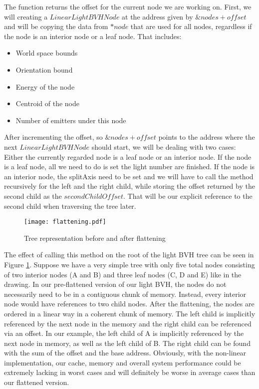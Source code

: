 The function returns the offset for the current node we are working on. First, we will creating a $LinearLightBVHNode$ at the address given by $\&nodes + offset$ and will be copying the data from $*node$ that are used for all nodes, regardless if the node is an interior node or a leaf node. That includes:

\begin{itemize}
	\item World space bounds
	\item Orientation bound
	\item Energy of the node
	\item Centroid of the node
	\item Number of emitters under this node
\end{itemize} 

After incrementing the offset, so $\&nodes + offset$ points to the address where the next $LinearLightBVHNode$ should start, we will be dealing with two cases: Either the currently regarded node is a leaf node or an interior node. If the node is a leaf node, all we need to do is set the light number are finished. If the node is an interior node, the splitAxis need to be set and we will have to call the method recursively for the left and the right child, while storing the offset returned by the second child as the $secondChildOffset$. That will be our explicit reference to the second child when traversing the tree later.

\begin{figure}
	\begin{center}
		\texttt{[image: flattening.pdf]}
		\caption{Tree representation before and after flattening}
		\label{fig:flattening}
	\end{center}
\end{figure}

The effect of calling this method on the root of the light BVH tree can be seen in Figure \ref{fig:flattening}. Suppose we have a very simple tree with only five total nodes consisting of two interior nodes (A and B) and three leaf nodes (C, D and E) like in the drawing. In our pre-flattened version of our light BVH, the nodes do not necessarily need to be in a contiguous chunk of memory. Instead, every interior node would have references to two child nodes. After the flattening, the nodes are ordered in a linear way in a coherent chunk of memory. The left child is implicitly referenced by the next node in the memory and the right child can be referenced via an offset. In our example, the left child of A is implicitly referenced by the next node in memory, as well as the left child of B. The right child can be found with the sum of the offset and the base address. Obviously, with the non-linear implementation, our cache, memory and overall system performance could be extremely lacking in worst cases and will definitely be worse in average cases than our flattened version.

